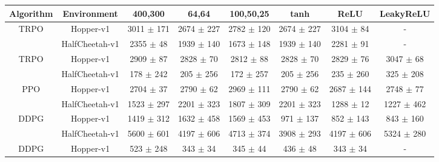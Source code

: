 \documentclass[letterpaper]{article} %
\begin{document}
\begin{table}
    \centering
    \scriptsize{\begin{tabular}{|c|c|c|c|c|c|c|c|}
    \hline
         \textbf{Algorithm} & \textbf{Environment} & \textbf{400,300} & \textbf{64,64} & \textbf{100,50,25} & \textbf{tanh} & \textbf{ReLU} & \textbf{LeakyReLU} \\
         \hline
         TRPO& Hopper-v1 & 3011 $\pm$ 171 & 2674 $\pm$ 227 & 2782 $\pm$ 120 & 2674 $\pm$ 227 & 3104 $\pm$ 84 & - \\
         \cite{TRPO}& HalfCheetah-v1 &2355 $\pm$ 48 & 1939 $\pm$ 140 & 1673 $\pm$ 148 & 1939 $\pm$ 140 & 2281 $\pm$ 91 & - \\
         \hline
         TRPO& Hopper-v1 & 2909 $\pm$ 87 & 2828 $\pm$ 70 & 2812 $\pm$ 88 & 2828 $\pm$ 70 & 2829 $\pm$ 76 & 3047 $\pm$ 68 \\
         \cite{PPO}& HalfCheetah-v1 & 178 $\pm$ 242 &205 $\pm$ 256& 172 $\pm$ 257 & 205 $\pm$ 256& 235 $\pm$ 260 & 325 $\pm$ 208 \\
         \hline
          PPO& Hopper-v1 & 2704 $\pm$ 37 & 2790 $\pm$ 62 & 2969 $\pm$ 111 & 2790 $\pm$ 62 & 2687 $\pm$ 144& 2748 $\pm$ 77 \\
         \cite{PPO}& HalfCheetah-v1 & 1523 $\pm$ 297 & 2201 $\pm$ 323 & 1807 $\pm$ 309 & 2201 $\pm$ 323 & 1288 $\pm$ 12 & 1227 $\pm$ 462 \\
         \hline
        DDPG& Hopper-v1 & 1419 $\pm$ 312  & 1632 $\pm$ 458 &  1569 $\pm$ 453  & 971 $\pm$ 137  & 852 $\pm$ 143  & 843 $\pm$ 160 \\
         \cite{plappert2017parameter} & HalfCheetah-v1 & 5600 $\pm$ 601 & 4197 $\pm$ 606 & 4713 $\pm$ 374 & 3908 $\pm$ 293 & 4197 $\pm$ 606 &  5324 $\pm$ 280\\
         \hline
         DDPG& Hopper-v1 &523 $\pm$ 248& 343 $\pm$ 34 & 345 $\pm$ 44 & 436 $\pm$ 48 & 343 $\pm$ 34& - \\

\end{tabular}}
\end{table}
\end{document}
